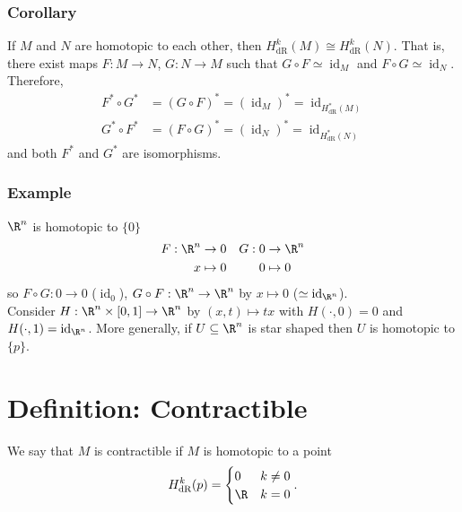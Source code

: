 \documentclass[11pt]{article}
\begin{document}
\subsubsection*{Corollary}
\label{sec:org10a5f4c}
If \(M\) and \(N\) are homotopic to each other, then \(H^{k}_{\text{dR}}(M)\cong H^{k}_{\text{dR}}(N)\). That is, there exist maps \(F:M\to N\), \(G:N\to M\) such that \(G\circ F\simeq\operatorname{id}_{M}\) and \(F\circ G\simeq\operatorname{id}_{N}\). Therefore,\\
\begin{align*}
  F^{*}\circ G^{*}
  &=(G\circ F)^{*}=(\operatorname{id}_{M})^{*}=\operatorname{id}_{H^{*}_{\text{dR}}(M)} \\
  G^{*}\circ F^{*}
  &=(F\circ G)^{*}=(\operatorname{id}_{N})^{*}=\operatorname{id}_{H^{*}_{\text{dR}}(N)}
\end{align*}
and both \(F^{*}\) and \(G^{*}\) are isomorphisms.\\
\subsubsection*{Example}
\label{sec:org4429656}
\(\R^{n}\) is homotopic to \(\{0\}\)\\
\begin{align*}
  F:\R^{n}&\to0 & G:0&\to\R^{n} \\
  x&\mapsto 0 & 0&\mapsto 0
\end{align*}
so \(F\circ G:0\to 0\) (\(\operatorname{id}_{0}\)), \(G\circ F:\R^{n}\to\R^{n}\) by \(x\mapsto 0\) (\(\simeq\operatorname{id}_{\R^{n}}\)).\\
Consider \(H:\R^{n}\times[0,1]\to\R^{n}\) by \((x,t)\mapsto tx\) with \(H(\cdot,0)=0\) and \(H(\cdot,1)=\operatorname{id}_{\R^{n}}\). More generally, if \(U\subseteq\R^{n}\) is star shaped then \(U\) is homotopic to \(\{p\}\).\\
\section*{Definition: Contractible}
\label{sec:org6dfc502}
We say that \(M\) is contractible if \(M\) is homotopic to a point\\
\begin{align*}
  H_{\text{dR}}^{k}(p)=
  \begin{cases}
    0 & k\neq0 \\
    \R & k=0
  \end{cases}.
\end{align*}
\end{document}
